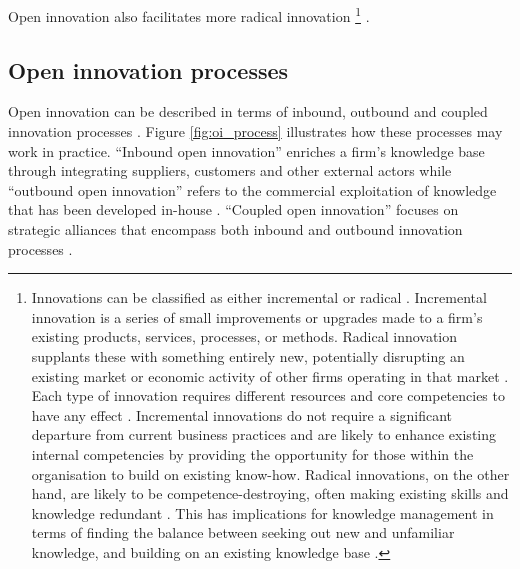 Open innovation also facilitates more radical innovation \footnote{Innovations can be classified as either incremental or radical \citep{henderson1990architectural}. Incremental innovation is a series of small improvements or upgrades made to a firm's existing products, services, processes, or methods. Radical innovation supplants these with something entirely new, potentially disrupting an existing market or economic activity of other firms operating in that market \citep{leifer2001implementing,mcdermott2002managing}. Each type of innovation requires different resources and core competencies to have any effect \citep{lam2000tacit,darroch2002examining}. Incremental innovations do not require a significant departure from current business practices and are likely to enhance existing internal competencies by providing the opportunity for those within the organisation to build on existing know-how. Radical innovations, on the other hand, are likely to be competence-destroying, often making existing skills and knowledge redundant \citep{tushman1986technological}. This has implications for knowledge management in terms of finding the balance between seeking out new and unfamiliar knowledge, and building on an existing knowledge base \citep{march1991exploration}.} \citep{inauen2012fostering,engen2014radical}.\medskip




\subsection{Open innovation processes}

Open innovation can be described in terms of inbound, outbound and coupled innovation processes \citep{chesbrough2006beyond,enkel2009open,gassmann2010future}. Figure \ref{fig:oi_process} illustrates how these processes may work in practice. \enquote{Inbound open innovation} enriches a firm’s knowledge base through integrating suppliers, customers and other external actors \citep{xu2013inbound} while \enquote{outbound open innovation} refers to the commercial exploitation of knowledge that has been developed in-house \citep{de2016knowledge}. \enquote{Coupled open innovation} focuses on strategic alliances that encompass both inbound and outbound innovation processes \citep{spithoven2013open}. \medskip

